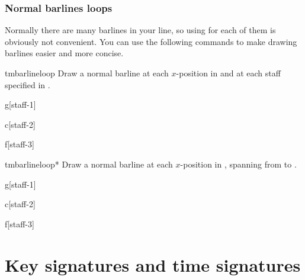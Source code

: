\documentclass[11pt,a4paper]{ltxdoc}
\begin{document}
\subsubsection{Normal barlines loops}\label{sec:multistaff:barlines:normal-loop}
Normally there are many barlines in your line, so using  for 
each of them is obviously not convenient. You can use the following commands 
to make drawing barlines easier and more concise.
\begin{docCommand}{tmbarlineloop}{}
  Draw a normal barline at each $x$-position in  and at each 
  staff specified in .
\end{docCommand}
\begin{dispExample}
\begin{tmmultiplestaves}[0pt]%
  \begin{tmstaff}{g}[staff-1]
  \end{tmstaff}%
  \begin{tmstaff}{c}[staff-2]
  \end{tmstaff}%
  \begin{tmstaff}{f}[staff-3]
  \end{tmstaff}%
\end{tmmultiplestaves}
\end{dispExample}
\begin{docCommand}{tmbarlineloop*}{}
  Draw a normal barline at each $x$-position in , spanning 
  from  to .
\end{docCommand}
\begin{dispExample}
\begin{tmmultiplestaves}[0pt]%
  \begin{tmstaff}{g}[staff-1]
  \end{tmstaff}%
  \begin{tmstaff}{c}[staff-2]
  \end{tmstaff}%
  \begin{tmstaff}{f}[staff-3]
  \end{tmstaff}%
\end{tmmultiplestaves}
\end{dispExample}
\section{Key signatures and time signatures}\label{sec:signatures}
\end{document}
